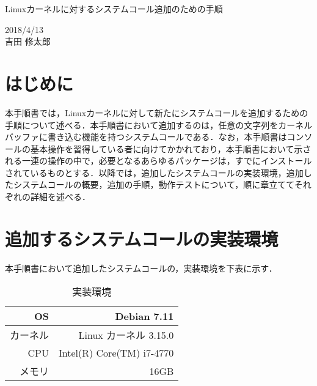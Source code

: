 \documentclass[12pt]{jsarticle}
\begin{document}
\begin{center}
{\LARGE Linuxカーネルに対するシステムコール追加のための手順}
\end{center}

\begin{flushright}
  2018/4/13\\
  吉田 修太郎
\end{flushright}
\section{はじめに}
本手順書では，Linuxカーネルに対して新たにシステムコールを追加するための手順について述べる．本手順書において追加するのは，任意の文字列をカーネルバッファに書き込む機能を持つシステムコールである．なお，本手順書はコンソールの基本操作を習得している者に向けてかかれており，本手順書において示される一連の操作の中で，必要となるあらゆるパッケージは，すでにインストールされているものとする．以降では，追加したシステムコールの実装環境，追加したシステムコールの概要，追加の手順，動作テストについて，順に章立ててそれぞれの詳細を述べる．

\section{追加するシステムコールの実装環境}
本手順書において追加したシステムコールの，実装環境を下表に示す．
\begin{table}[h!]
  \begin{center}
    \caption{実装環境}%
    \begin{tabular}{r|r}
      \hline\hline
      OS & Debian 7.11 \\
      \hline
      カーネル & Linux カーネル 3.15.0 \\
      \hline
      CPU & Intel(R) Core(TM) i7-4770 \\
      \hline
      メモリ & 16GB\\
      \hline
    \end{tabular}
  \end{center}
\end{table}
\end{document}
